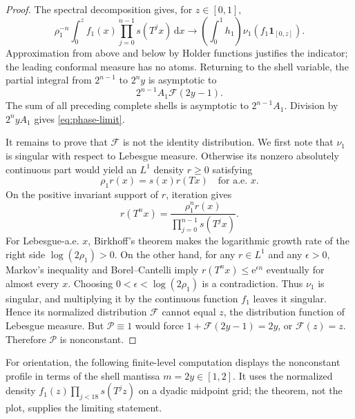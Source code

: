 \documentclass[11pt,oneside]{article}
\theoremstyle{definition}
\theoremstyle{remark}
\newcommand{\e}{\mathrm e}
\newcommand{\dd}{\,\mathrm d}
\begin{document}
\begin{proof}
The spectral decomposition gives, for $z\in[0,1]$,
\[
 \rho_1^{-n}\int_0^z f_1(x)
 \prod_{j=0}^{n-1}s(T^jx)\dd x
 \longrightarrow
 \left(\int_0^1h_1\right)\nu_1(f_1\mathbf1_{[0,z]}).
\]
Approximation from above and below by Holder functions justifies the indicator; the
leading conformal measure has no atoms.  Returning to the shell variable, the partial
integral from $2^{n-1}$ to $2^ny$ is asymptotic to
\[
 2^{n-1}A_1\mathscr F(2y-1).
\]
The sum of all preceding complete shells is asymptotic to $2^{n-1}A_1$.  Division by
$2^nyA_1$ gives \eqref{eq:phase-limit}.

It remains to prove that $\mathscr F$ is not the identity distribution.  We first note that
$\nu_1$ is singular with respect to Lebesgue measure.  Otherwise its nonzero absolutely
continuous part would yield an $L^1$ density $r\ge0$ satisfying
\begin{equation}
 \rho_1r(x)=s(x)r(Tx)
 \quad\text{for a.e. }x.
 \label{eq:conformal-density}
\end{equation}
On the positive invariant support of $r$, iteration gives
\[
 r(T^nx)=\frac{\rho_1^nr(x)}{\prod_{j=0}^{n-1}s(T^jx)}.
\]
For Lebesgue-a.e. $x$, Birkhoff's theorem makes the logarithmic growth rate of the right
side $\log(2\rho_1)>0$.  On the other hand, for any $r\in L^1$ and any $\epsilon>0$,
Markov's inequality and Borel--Cantelli imply
$r(T^nx)\le\e^{\epsilon n}$ eventually for almost every $x$.  Choosing
$0<\epsilon<\log(2\rho_1)$ is a contradiction.  Thus $\nu_1$ is singular, and multiplying
it by the continuous function $f_1$ leaves it singular.  Hence its normalized distribution
$\mathscr F$ cannot equal $z$, the distribution function of Lebesgue measure.  But
$\mathscr P\equiv1$ would force
$1+\mathscr F(2y-1)=2y$, or $\mathscr F(z)=z$.  Therefore $\mathscr P$ is nonconstant.
\end{proof}

For orientation, the following finite-level computation displays the nonconstant profile in
terms of the shell mantissa $m=2y\in[1,2]$.  It uses the normalized density
$f_1(z)\prod_{j<18}s(T^jz)$ on a dyadic midpoint grid; the theorem, not the plot, supplies
the limiting statement.

\begin{center}
\end{center}
\end{document}
